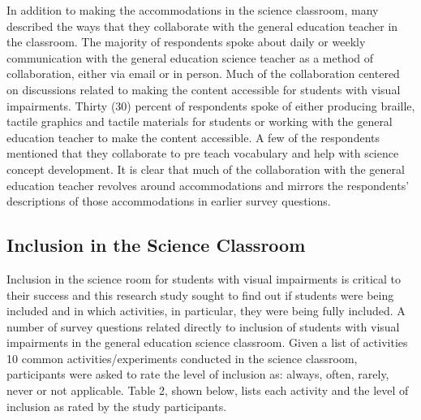 \documentclass[11.5pt]{sig-alternate} %
\begin{document}
\begin{large}
In addition to making the accommodations in the science classroom, many described the ways that they collaborate with the general education teacher in the classroom.  The majority of respondents spoke about daily or weekly communication with the general education science teacher as a method of collaboration, either via email or in person.  Much of the collaboration centered on discussions related to making the content accessible for students with visual impairments.  Thirty (30) percent of respondents spoke of either producing braille, tactile graphics and tactile materials for students or working with the general education teacher to make the content accessible.  A few of the respondents mentioned that they collaborate to pre teach vocabulary and help with science concept development.  It is clear that much of the collaboration with the general education teacher revolves around accommodations and mirrors the respondents’ descriptions of those accommodations in earlier survey questions.  

\subsection*{Inclusion in the Science Classroom}

Inclusion in the science room for students with visual impairments is critical to their success and this research study sought to find out if students were being included and in which activities, in particular, they were being fully included.  A number of survey questions related directly to inclusion of students with visual impairments in the general education science classroom.  Given a list of activities 10 common activities/experiments conducted in the science classroom, participants were asked to rate the level of inclusion as:  always, often, rarely, never or not applicable.  Table 2, shown below, lists each activity and the level of inclusion as rated by the study participants.  


\end{large}
\end{document}
